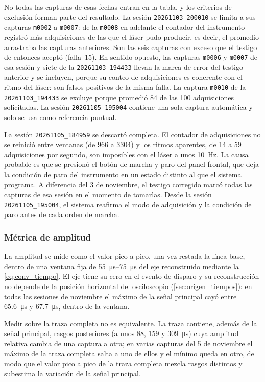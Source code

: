 No todas las capturas de esas fechas entran en la tabla, y los
criterios de exclusión forman parte del resultado. La sesión
\texttt{20261103\_200010} se limita a sus capturas \texttt{m0002} a
\texttt{m0007}: de la \texttt{m0008} en adelante el contador del
instrumento registró más adquisiciones de las que el láser pudo
producir, es decir, el promedio arrastraba las capturas anteriores. Son
las seis capturas con exceso que el testigo de entonces aceptó
(falla~15). En sentido opuesto, las capturas \texttt{m0006} y
\texttt{m0007} de esa sesión y siete de la \texttt{20261103\_194433}
llevan la marca de error del testigo anterior y se incluyen, porque su
conteo de adquisiciones es coherente con el ritmo del láser: son falsos
positivos de la misma falla. La captura \texttt{m0010} de la
\texttt{20261103\_194433} se excluye porque promedió 84 de las 100
adquisiciones solicitadas. La sesión \texttt{20261105\_195004} contiene
una sola captura automática y solo se usa como referencia puntual.

La sesión \texttt{20261105\_184959} se descartó completa. El contador
de adquisiciones no se reinició entre ventanas (de 966 a 3304) y los
ritmos aparentes, de 14 a 59 adquisiciones por segundo, son imposibles
con el láser a unos \SI{10}{\hertz}. La causa probable es que se
presionó el botón de marcha y paro del panel frontal, que deja la
condición de paro del instrumento en un estado distinto al que el
sistema programa. A diferencia del 3 de noviembre, el testigo corregido
marcó todas las capturas de esa sesión en el momento de tomarlas. Desde
la sesión \texttt{20261105\_195004}, el sistema reafirma el modo de
adquisición y la condición de paro antes de cada orden de marcha.

\subsubsection{Métrica de amplitud}

La amplitud se mide como el valor pico a pico, una vez restada la línea
base, dentro de una ventana fija de \SIrange{55}{75}{\micro\second} del
eje reconstruido mediante la \cref{eq:conv_tiempo}. El eje tiene su cero
en el evento de disparo y su reconstrucción no depende de la posición
horizontal del osciloscopio (\cref{sec:origen_tiempos}): en todas las
sesiones de noviembre el máximo de la señal principal cayó entre
\SI{65.6}{\micro\second} y \SI{67.7}{\micro\second}, dentro de la
ventana.

Medir sobre la traza completa no es equivalente. La traza contiene,
además de la señal principal, rasgos posteriores (a unos 88, 159 y
\SI{309}{\micro\second}) cuya amplitud relativa cambia de una captura a
otra; en varias capturas del 5 de noviembre el máximo de la traza
completa salta a uno de ellos y el mínimo queda en otro, de modo que el
valor pico a pico de la traza completa mezcla rasgos distintos y
subestima la variación de la señal principal.

